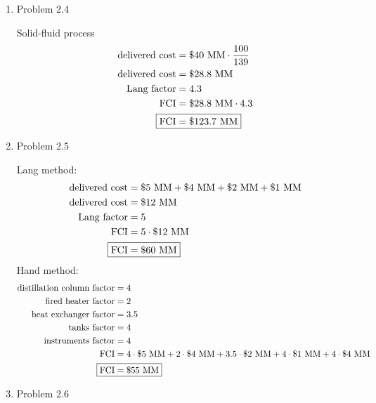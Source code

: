 \documentclass[12pt]{article}
\begin{document}
\begin{enumerate}
\newpage
    \item Problem 2.4

    Solid-fluid process
    \begin{align*}
        \text{delivered cost} &= \$ 40 \text{ MM} \cdot \frac{100}{139} \\
        \text{delivered cost} &= \$ 28.8 \text{ MM} \\
        \text{Lang factor} &= 4.3 \\
        \mathrm{FCI} &= \$ 28.8 \text{ MM} \cdot 4.3 \\
        \Aboxed{\mathrm{FCI} &= \$ 123.7 \text{ MM}}
    \end{align*}

\newpage
    \item Problem 2.5

    Lang method:
    \begin{align*}
        \text{delivered cost} &= \$ 5 \text{ MM} + \$ 4 \text{ MM} + \$ 2 \text{ MM} + \$ 1 \text{ MM} \\
         \text{delivered cost} &= \$ 12 \text{ MM} \\
        \text{Lang factor} &= 5 \\
        \mathrm{FCI} &= 5 \cdot \$ 12 \text{ MM} \\
        \Aboxed{\mathrm{FCI} &= \$ 60 \text{ MM}}
    \end{align*}
    Hand method:
    \begin{align*}
        \text{distillation column factor} &= 4 \\ 
        \text{fired heater factor} &= 2 \\ 
        \text{heat exchanger factor} &= 3.5 \\ 
        \text{tanks factor} &= 4 \\
        \text{instruments factor} &= 4 \\ 
        \mathrm{FCI} &= 4 \cdot \$ 5 \text{ MM} + 2 \cdot \$ 4 \text{ MM} + 3.5 \cdot \$ 2 \text{ MM} + 4 \cdot \$ 1 \text{ MM} + 4 \cdot \$ 4 \text{ MM} \\
        \Aboxed{\mathrm{FCI} &= \$ 55 \text{ MM}}
    \end{align*}

\newpage
    \item Problem 2.6


\end{enumerate}
\end{document}
